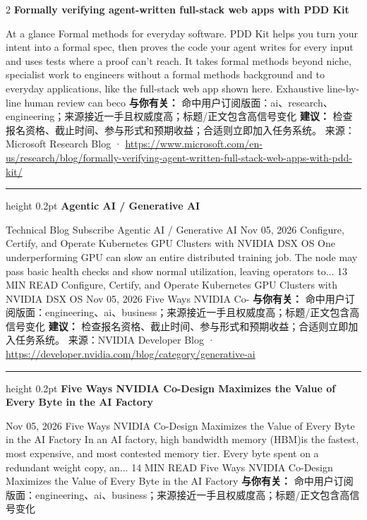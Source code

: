 \documentclass[10.5pt]{ctexart}
\begin{document}
\begin{multicols}{2}
{\large\bfseries Formally verifying agent-written full-stack web apps with PDD Kit}\par
At a glance Formal methods for everyday software. PDD Kit helps you turn your intent into a formal spec, then proves the code your agent writes for every input and uses tests where a proof can’t reach. It takes formal methods beyond niche, specialist work to engineers without a formal methods background and to everyday applications, like the full-stack web app shown here. Exhaustive line-by-line human review can beco
\textbf{与你有关：} 命中用户订阅版面：ai、research、engineering；来源接近一手且权威度高；标题/正文包含高信号变化
\textbf{建议：} 检查报名资格、截止时间、参与形式和预期收益；合适则立即加入任务系统。
{\footnotesize\color{ormuted} 来源：Microsoft Research Blog · \url{https://www.microsoft.com/en-us/research/blog/formally-verifying-agent-written-full-stack-web-apps-with-pdd-kit/}}
\vspace{2mm}
\hrule height 0.2pt
\vspace{2mm}
{\large\bfseries Agentic AI / Generative AI}\par
Technical Blog Subscribe Agentic AI / Generative AI Nov 05, 2026 Configure, Certify, and Operate Kubernetes GPU Clusters with NVIDIA DSX OS One underperforming GPU can slow an entire distributed training job. The node may pass basic health checks and show normal utilization, leaving operators to... 13 MIN READ Configure, Certify, and Operate Kubernetes GPU Clusters with NVIDIA DSX OS Nov 05, 2026 Five Ways NVIDIA Co-
\textbf{与你有关：} 命中用户订阅版面：engineering、ai、business；来源接近一手且权威度高；标题/正文包含高信号变化
\textbf{建议：} 检查报名资格、截止时间、参与形式和预期收益；合适则立即加入任务系统。
{\footnotesize\color{ormuted} 来源：NVIDIA Developer Blog · \url{https://developer.nvidia.com/blog/category/generative-ai}}
\vspace{2mm}
\hrule height 0.2pt
\vspace{2mm}
{\large\bfseries Five Ways NVIDIA Co-Design Maximizes the Value of Every Byte in the AI Factory}\par
Nov 05, 2026 Five Ways NVIDIA Co-Design Maximizes the Value of Every Byte in the AI Factory In an AI factory, high bandwidth memory (HBM)is the fastest, most expensive, and most contested memory tier. Every byte spent on a redundant weight copy, an... 14 MIN READ Five Ways NVIDIA Co-Design Maximizes the Value of Every Byte in the AI Factory
\textbf{与你有关：} 命中用户订阅版面：engineering、ai、business；来源接近一手且权威度高；标题/正文包含高信号变化

\end{multicols}
\end{document}
